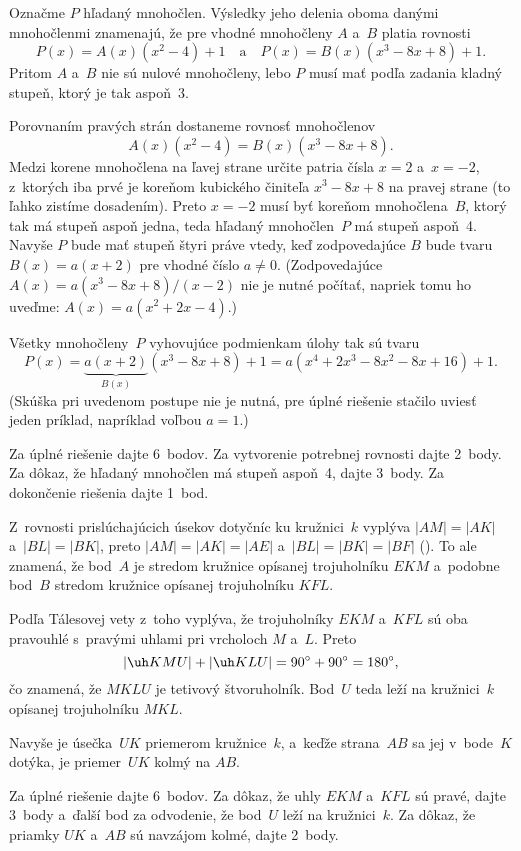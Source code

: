 {%
Označme $P$ hľadaný mnohočlen. Výsledky jeho delenia oboma danými
mnohočlenmi znamenajú, že pre vhodné mnohočleny $A$ a~$B$ platia
rovnosti
$$
P(x)=A(x)(x^2-4)+1\quad\text{a}\quad
P(x)=B(x)(x^3-8x+8)+1.
$$
Pritom $A$ a~$B$ nie sú nulové mnohočleny, lebo $P$ musí mať
podľa zadania kladný stupeň, ktorý je tak aspoň~3.

Porovnaním pravých strán dostaneme rovnosť mnohočlenov
$$
A(x)(x^2-4)=B(x)(x^3-8x+8).
$$
Medzi korene mnohočlena na ľavej strane určite patria čísla $x=2$ a~$x={-2}$,
z~ktorých iba prvé je koreňom kubického činiteľa $x^3-8x+8$ na
pravej strane (to ľahko zistíme dosadením).
Preto $x={-2}$ musí byť koreňom mnohočlena~$B$, ktorý tak má
stupeň aspoň jedna, teda hľadaný mnohočlen~$P$ má stupeň aspoň~4.
Navyše $P$ bude mať stupeň štyri práve vtedy, keď
zodpovedajúce $B$ bude tvaru $B(x)=a(x+2)$ pre vhodné číslo
$a\ne0$. (Zodpovedajúce $A(x)=a(x^3-8x+8)/(x-2)$ nie je
nutné počítať, napriek tomu ho uveďme: $A(x)=a(x^2+2x-4)$.)

Všetky mnohočleny~$P$ vyhovujúce podmienkam úlohy
tak sú tvaru
$$
P(x)=\underbrace{a(x+2)}_{B(x)}(x^3-8x+8)+1=a(x^4+2x^3-8x^2-8x+16)+1.
$$
(Skúška pri uvedenom postupe nie je nutná, pre úplné riešenie stačilo
uviesť jeden príklad, napríklad voľbou $a=1$.)



\nobreak\medskip\petit\noindent
Za úplné riešenie dajte 6~bodov.
Za vytvorenie potrebnej rovnosti
dajte 2~body. Za dôkaz, že
hľadaný mnohočlen má stupeň aspoň~4, dajte 3~body. Za dokončenie riešenia
dajte 1~bod.
\endpetit
\bigbreak
}

{%
Z~rovnosti prislúchajúcich úsekov dotyčníc ku kružnici~$k$ vyplýva $|AM|=|AK|$
a~$|BL|=|BK|$, preto $|AM|=|AK|=|AE|$ a~$|BL|=|BK|=|BF|$ (\obr).
To ale znamená, že bod~$A$ je stredom kružnice opísanej trojuholníku $EKM$
a~podobne bod~$B$ stredom kružnice opísanej trojuholníku $KFL$.
%

Podľa Tálesovej vety z~toho vyplýva,
že trojuholníky $EKM$ a~$KFL$ sú oba pravouhlé s~pravými uhlami pri
vrcholoch $M$ a~$L$. Preto
$$
|\uh KMU|+|\uh KLU|=90^{\circ}+90^{\circ}=180^{\circ},
$$
čo znamená, že $MKLU$ je tetivový štvoruholník.
Bod~$U$ teda leží na kružnici~$k$ opísanej trojuholníku $MKL$.

Navyše je úsečka~$UK$ priemerom kružnice~$k$, a~keďže strana~$AB$ sa jej
v~bode~$K$ dotýka, je priemer~$UK$ kolmý na $AB$.



\nobreak\medskip\petit\noindent
Za úplné riešenie dajte 6~bodov.
Za dôkaz, že uhly $EKM$ a~$KFL$ sú pravé, dajte 3~body a~ďalší bod
za odvodenie,
že bod~$U$ leží na kružnici~$k$. Za dôkaz, že priamky
$UK$ a~$AB$ sú navzájom kolmé, dajte 2~body.
\endpetit
\bigbreak
}

